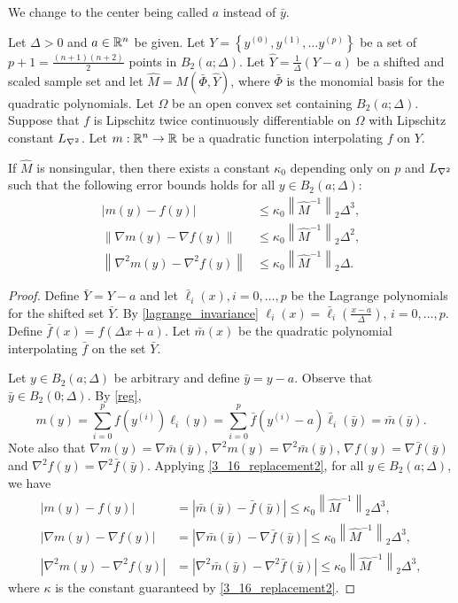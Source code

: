 \documentclass{article}
\newcommand{\real}{\mathbb R}
\begin{document}
\color{magenta}
We change to the center being called $a$ instead of $\bar y$.
\color{black}

\begin{corollary}  \label{error_bounds_shifted}
Let  $\Delta>0$ and $a \in \mathbb R^n$ be given.  Let $Y = \left\{y^{(0)}, y^{(1)}, \ldots y^{(p)} \right\}$ be a set of $p+1=\frac{(n+1)(n+2)}{2}$ points in $B_2\left(a;\Delta\right)$.    Let  $\hat{Y}=\frac{1}{\Delta} \left(Y-a\right)$ be a shifted and scaled sample set and let $\hat{M} = M(\bar \Phi,\hat{Y})$, where $\bar \Phi$ is the monomial basis for  the quadratic polynomials.  Let $\Omega$ be an open convex set containing $B_2(a;\Delta)$.
Suppose that $f$ is Lipschitz twice continuously differentiable on $\Omega$ with Lipschitz constant ${L_{\nabla^2}}$.
Let $m: \Rn \rightarrow \real$ be a quadratic function interpolating $f$ on $Y$.

If $\hat{M}$ is nonsingular, then there exists a constant $\kappa_0$ depending only on $p$ and ${L_{\nabla^2}}$ such that the following error bounds holds for all $y \in B_2\left(a; \Delta\right)$:
\begin{align}
\left|m(y) - f(y)\right| &\le \kappa_0 \left\|\hat M^{-1}\right\|_2 \Delta^3,  \\
\left\|\nabla m(y) - \nabla f(y)\right\| &\le \kappa_0 \left\|\hat M^{-1} \right\|_2\Delta^2, \\
\left\|\nabla^2 m(y) - \nabla^2 f(y)\right\| &\le \kappa_0 \left\|\hat M^{-1} \right\|_2\Delta. 
\end{align}

\end{corollary}
\begin{proof}
Define $\bar{Y}=Y-a$ and let $\bar{\ell}_i(x), i=0,\dots,p$ be the Lagrange polynomials for the shifted set $\bar{Y}$.  By \cref{lagrange_invariance} $\ell_i(x) = \bar{\ell}_i\left(\frac{x-a}{\Delta}\right)$, $i=0,\ldots,p$.  Define $\bar{f}(x)= f(\Delta x + a)$.   Let $\bar{m}(x)$ be the quadratic polynomial interpolating $\bar{f}$ on the set $\bar{Y}$.   

Let $y \in B_2(a;\Delta)$ be arbitrary and define $\bar{y} =y-a$.  Observe that $\bar{y}  \in B_2(0;\Delta)$.    By \cref{reg},
\[ m(y)=\sum_{i=0}^p f(y^{(i)}) \ell_i(y) = \sum_{i=0}^p \bar{f}(y^{(i)}-a) \bar{\ell}_i(\bar{y})=\bar{m}(\bar{y}).\]
Note also that $\nabla m(y)=\nabla \bar{m}(\bar{y})$, $\nabla^2 m(y)=\nabla^2 \bar{m}(\bar{y})$, $\nabla f(y)=\nabla \bar{f}(\bar{y})$ and $\nabla^2 f(y)=\nabla^2 \bar{f}(\bar{y})$.  
Applying \cref{3_16_replacement2}, for all $y \in B_2(a;\Delta)$, we have
\begin{align}
|m(y)-f(y)| & = |\bar{m}(\bar{y})-\bar{f}(\bar{y})| \le \kappa_0 \left\| \hat{M}^{-1} \right\|_2 \Delta^3, \\
|\nabla m(y)-\nabla f(y)| & = |\nabla \bar{m}(\bar{y})-\nabla \bar{f}(\bar{y})| \le \kappa_0 \left\| \hat{M}^{-1} \right\|_2 \Delta^3, \\
|\nabla^2 m(y)-\nabla^2 f(y)| & = |\nabla^2 \bar{m}(\bar{y})- \nabla^2 \bar{f}(\bar{y})| \le \kappa_0 \left\| \hat{M}^{-1} \right\|_2 \Delta^3, 
\end{align}
where $\kappa$ is the constant guaranteed by \cref{3_16_replacement2}.
\end{proof}
\end{document}

